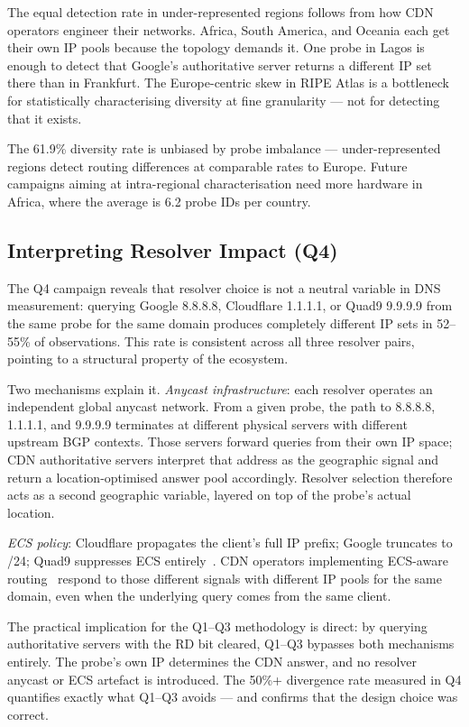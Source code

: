 The equal detection rate in under-represented regions follows from how \ac{CDN} operators engineer their networks. Africa, South America, and Oceania each get their own \ac{IP} pools because the topology demands it. One probe in Lagos is enough to detect that Google's authoritative server returns a different \ac{IP} set there than in Frankfurt. The Europe-centric skew in RIPE Atlas is a bottleneck for statistically characterising diversity at fine granularity --- not for detecting that it exists.

The 61.9\% diversity rate is unbiased by probe imbalance --- under-represented regions detect routing differences at comparable rates to Europe. Future campaigns aiming at intra-regional characterisation need more hardware in Africa, where the average is 6.2 probe IDs per country.

\bigskip
\subsection{Interpreting Resolver Impact (Q4)}
\label{subsec:5.1.4}

The Q4 campaign reveals that resolver choice is not a neutral variable in \ac{DNS} measurement: querying Google 8.8.8.8, Cloudflare 1.1.1.1, or Quad9 9.9.9.9 from the same probe for the same domain produces completely different \ac{IP} sets in 52--55\% of observations. This rate is consistent across all three resolver pairs, pointing to a structural property of the ecosystem.

Two mechanisms explain it. \textit{Anycast infrastructure}: each resolver operates an independent global anycast network. From a given probe, the path to 8.8.8.8, 1.1.1.1, and 9.9.9.9 terminates at different physical servers with different upstream \ac{BGP} contexts. Those servers forward queries from their own \ac{IP} space; \ac{CDN} authoritative servers interpret that address as the geographic signal and return a location-optimised answer pool accordingly. Resolver selection therefore acts as a second geographic variable, layered on top of the probe's actual location.

\textit{\ac{ECS} policy}: Cloudflare propagates the client's full \ac{IP} prefix; Google truncates to /24; Quad9 suppresses \ac{ECS} entirely~\cite{RFC7871}. \ac{CDN} operators implementing \ac{ECS}-aware routing~\cite{Wang2018} respond to those different signals with different \ac{IP} pools for the same domain, even when the underlying query comes from the same client.

The practical implication for the Q1--Q3 methodology is direct: by querying authoritative servers with the \ac{RD} bit cleared, Q1--Q3 bypasses both mechanisms entirely. The probe's own \ac{IP} determines the \ac{CDN} answer, and no resolver anycast or \ac{ECS} artefact is introduced. The 50\%+ divergence rate measured in Q4 quantifies exactly what Q1--Q3 avoids --- and confirms that the design choice was correct.

